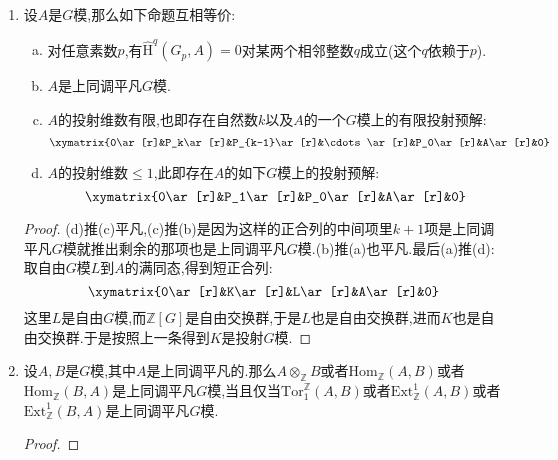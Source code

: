 \begin{enumerate}
\begin{proof}
		(b)推(a):对$G$的任意子群$H$,有$\mathbb{Z}[G]$是自由$\mathbb{Z}[H]$(左)模,结合投射模是自由模的直和项,就得到$A$也是每个$G_p$投射模,特别的每个$G_p$模$A$是上同调平凡模(因为投射模是相对投射模).
		
		(a)推(b):把$A$写做某个自由$G$模$L$的商:
		$$\xymatrix{0\ar[r]&N\ar[r]&L\ar[r]&A\ar[r]&0}$$
		按照$A$是自由$\mathbb{Z}$模,我们有短正合列:
		$$\xymatrix{0\ar[r]&\mathrm{Hom}_{\mathbb{Z}}(A,N)\ar[r]&\mathrm{Hom}_{\mathbb{Z}}(A,L)\ar[r]&\mathrm{Hom}_{\mathbb{Z}}(A,A)\ar[r]&0}$$
		这里$N$作为自由交换群的子群仍然是自由的,特别的它是无扭的,于是上一条引理得到$G_p$模$\mathrm{Hom}_{\mathbb{Z}}(A,N)$是上同调平凡模.进而按照上面推论有$\mathrm{H}^1(G,\mathrm{Hom}_{\mathbb{Z}}(A,N))=0$.进而我们有满同态:
		$$\mathrm{Hom}_G(A,L)\to\mathrm{Hom}_G(A,A)$$
		特别的,$1_A$延拓为一个$G$同态$A\to L$,进而$A$是自由$G$模$L$的直和项,于是$A$是投射$G$模.
	\end{proof}
	\item 设$A$是$G$模,那么如下命题互相等价:
	\begin{enumerate}[(a)]
		\item 对任意素数$p$,有$\widehat{\mathrm{H}}^q(G_p,A)=0$对某两个相邻整数$q$成立(这个$q$依赖于$p$).
		\item $A$是上同调平凡$G$模.
		\item $A$的投射维数有限,也即存在自然数$k$以及$A$的一个$G$模上的有限投射预解:
		$$\xymatrix{0\ar[r]&P_k\ar[r]&P_{k-1}\ar[r]&\cdots\ar[r]&P_0\ar[r]&A\ar[r]&0}$$
		\item $A$的投射维数$\le1$,此即存在$A$的如下$G$模上的投射预解:
		$$\xymatrix{0\ar[r]&P_1\ar[r]&P_0\ar[r]&A\ar[r]&0}$$
	\end{enumerate}
	\begin{proof}
		
		(d)推(c)平凡,(c)推(b)是因为这样的正合列的中间项里$k+1$项是上同调平凡$G$模就推出剩余的那项也是上同调平凡$G$模.(b)推(a)也平凡.最后(a)推(d):取自由$G$模$L$到$A$的满同态,得到短正合列:
		$$\xymatrix{0\ar[r]&K\ar[r]&L\ar[r]&A\ar[r]&0}$$
		这里$L$是自由$G$模,而$\mathbb{Z}[G]$是自由交换群,于是$L$也是自由交换群,进而$K$也是自由交换群.于是按照上一条得到$K$是投射$G$模.
	\end{proof}
	\item 设$A,B$是$G$模,其中$A$是上同调平凡的.那么$A\otimes_{\mathbb{Z}}B$或者$\mathrm{Hom}_{\mathbb{Z}}(A,B)$或者$\mathrm{Hom}_{\mathbb{Z}}(B,A)$是上同调平凡$G$模,当且仅当$\mathrm{Tor}_1^{\mathbb{Z}}(A,B)$或者$\mathrm{Ext}_{\mathbb{Z}}^1(A,B)$或者$\mathrm{Ext}_{\mathbb{Z}}^1(B,A)$是上同调平凡$G$模.
	\begin{proof}
		

\end{proof}
\end{enumerate}
